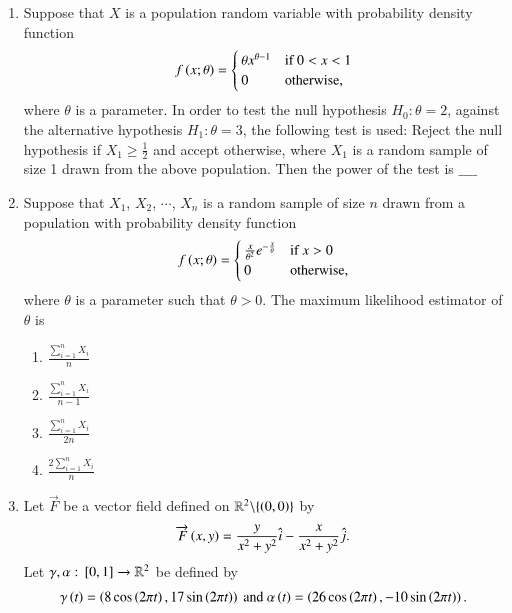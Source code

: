 \documentclass[journal]{IEEEtran}
\begin{document}
\begin{enumerate}
\item Suppose that $X$ is a population random variable with probability density function
\begin{align*}
    f\left(x; \theta\right) = \begin{cases}
        \theta x^{\theta-1} & \text{if}\ 0 < x < 1 \\
        0 & \text{otherwise},
    \end{cases}
\end{align*}
where $\theta$ is a parameter. In order to test the null hypothesis $H_0: \theta = 2$, against the alternative hypothesis $H_1: \theta = 3$, the following test is used: Reject the null hypothesis if $X_1 \geq \frac{1}{2}$ and accept otherwise, where $X_1$ is a random sample of size 1 drawn from the above population. Then the power of the test is $\_\_\_\_$ \\
\item Suppose that $X_1$, $X_2$, $\cdots$, $X_n$ is a random sample of size $n$ drawn from a population with probability density function 
\begin{align*}
    f\left(x; \theta\right) = \begin{cases}
        \frac{x}{\theta^2}e^{-\frac{x}{\theta}} & \text{if}\ x > 0 \\
        0 & \text{otherwise},
    \end{cases}
\end{align*}
where $\theta$ is a parameter such that $\theta > 0$. The maximum likelihood estimator of $\theta$ is
\begin{enumerate}
    \item $\frac{\sum\limits_{i=1}^{n}X_i}{n}$
    \item $\frac{\sum\limits_{i=1}^{n}X_i}{n-1}$
    \item $\frac{\sum\limits_{i=1}^{n}X_i}{2n}$
    \item $\frac{2\sum\limits_{i=1}^{n}X_i}{n}$ \\
\end{enumerate}
\item Let $\overrightarrow{F}$ be a vector field defined on $\mathbb{R}^2\backslash\{\left(0,0\right)\}$ by 
\begin{align*}
    \overrightarrow{F}\left(x, y\right) = \frac{y}{x^2 + y^2}\hat{i} - \frac{x}{x^2 + y^2}\hat{j}.
\end{align*}
Let $\gamma,\alpha:{}\left[0,1\right]\rightarrow\mathbb{R}^2$ be defined by
\begin{align*}
    \gamma\brak{t} = \brak{8\cos\brak{2 \pi t}, 17\sin\brak{2 \pi t}}\ \text{and}\ \alpha\brak{t} = \brak{26\cos\brak{2 \pi t}, -10\sin\brak{2 \pi t}}.

\end{align*}
\end{enumerate}
\end{document}
